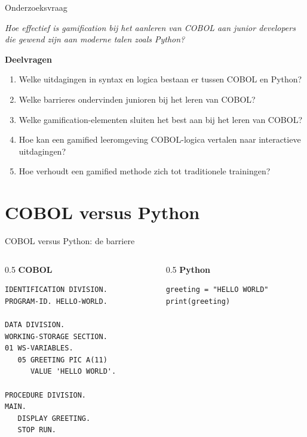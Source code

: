 \documentclass[aspectratio=169,11pt]{beamer}
\begin{document}
\begin{frame}{Onderzoeksvraag}
  \begin{center}
    \begin{minipage}{0.88\textwidth}
        \centering\itshape Hoe effectief is gamification bij het aanleren van COBOL aan junior developers die gewend zijn aan moderne talen zoals Python?
    \end{minipage}
  \end{center}
  \medskip
  \textbf{Deelvragen}
  \begin{enumerate}\small
    \item Welke uitdagingen in syntax en logica bestaan er tussen COBOL en Python?
    \item Welke barrieres ondervinden junioren bij het leren van COBOL?
    \item Welke gamification-elementen sluiten het best aan bij het leren van COBOL?
    \item Hoe kan een gamified leeromgeving COBOL-logica vertalen naar interactieve uitdagingen?
    \item Hoe verhoudt een gamified methode zich tot traditionele trainingen?
  \end{enumerate}
\end{frame}

\section{COBOL versus Python}

\begin{frame}[fragile]{COBOL versus Python: de barriere}
  \begin{columns}[T]
    \begin{column}{0.5\textwidth}
      \centering\textbf{COBOL}
\begin{lstlisting}
IDENTIFICATION DIVISION.
PROGRAM-ID. HELLO-WORLD.

DATA DIVISION.
WORKING-STORAGE SECTION.
01 WS-VARIABLES.
   05 GREETING PIC A(11)
      VALUE 'HELLO WORLD'.

PROCEDURE DIVISION.
MAIN.
   DISPLAY GREETING.
   STOP RUN.
\end{lstlisting}
    \end{column}
    \begin{column}{0.5\textwidth}
      \centering\textbf{Python}
\begin{lstlisting}
greeting = "HELLO WORLD"
print(greeting)
\end{lstlisting}
    \end{column}
  \end{columns}
\end{frame}
\end{document}
